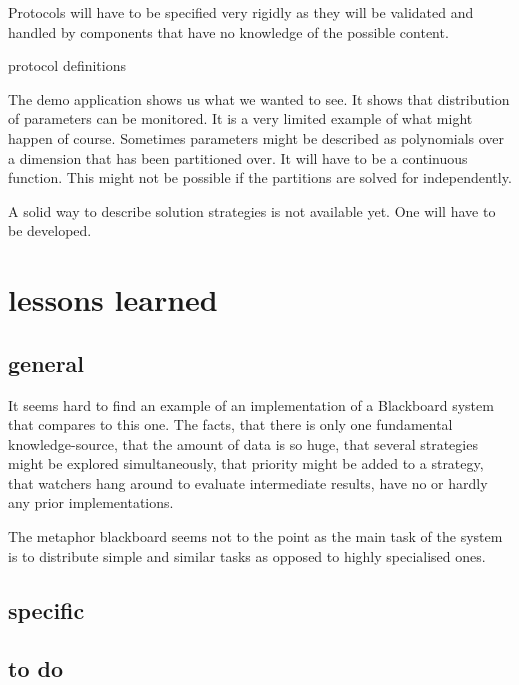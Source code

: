 \documentclass[]{lofar}
\begin{document}
      \begin{lessonlearned}
        Protocols will have to be specified very rigidly as they will
        be validated and handled by components that have no knowledge
        of the possible content.
        \caption{protocol definitions\label{les:protocols}}
      \end{lessonlearned}

      The demo application shows us what we wanted to see. It shows
      that distribution of parameters can be monitored. It is a very
      limited example of what might happen of course. Sometimes
      parameters might be described as polynomials over a dimension
      that has been partitioned over. It will have to be a continuous
      function. This might not be possible if the partitions are
      solved for independently.

      A solid way to describe solution strategies is not available
      yet. One will have to be developed.

  \section{lessons learned}
  \label{sec:lessons-learned}

    \subsection{general}

    It seems hard to find an example of an implementation of a
    Blackboard system that compares to this one. The facts, that there
    is only one fundamental knowledge-source, that the amount of data
    is so huge, that several strategies might be explored
    simultaneously, that priority might be added to a strategy, that
    watchers hang around to evaluate intermediate results, have no or
    hardly any prior implementations.

    The metaphor blackboard seems not to the point as the main task of
    the system is to distribute simple and similar tasks as opposed to
    highly specialised ones.

    \subsection{specific}


    \subsection{to do}
\end{document}
